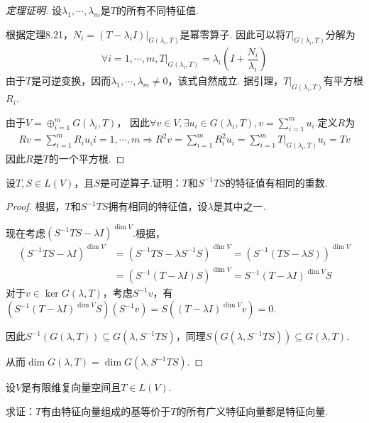 \begin{proof}[定理证明]
    设\(\lambda_1,\cdots,\lambda_m\)是\(T\)的所有不同特征值.

    根据定理8.21，\(N_i=(T-\lambda_i I)|_{G(\lambda_i,T)}\)是幂零算子.
    因此可以将\(T|_{G(\lambda_i,T)}\)分解为
    \begin{align*}
        \forall i=1,\cdots,m,T|_{G(\lambda_i,T)}=\lambda_i(I+\dfrac{N_i}{\lambda_i})
    \end{align*}
    由于\(T\)是可逆变换，因而\(\lambda_1,\cdots,\lambda_m \ne 0\)，该式自然成立.
    据引理，\(T|_{G(\lambda_i,T)}\)有平方根\(R_i\).
    
    由于\(V=\oplus_{i=1}^m G(\lambda_i,T)\)，
    因此\(\forall v \in V,\exists u_i \in G(\lambda_i,T),v=\sum_{i=1}^m u_i\).定义\(R\)为
    \begin{align*}
        Rv=\sum_{i=1}^m R_iu_i i=1,\cdots,m \Rightarrow
        R^2v=\sum_{i=1}^m R_i^2 u_i=\sum_{i=1}^m T|_{G(\lambda_i,T)}u_i=Tv
    \end{align*}
    因此\(R\)是\(T\)的一个平方根.
\end{proof}

\newpage

\begin{problem}[3]\label{8.B.3}
    设\(T,S \in L(V)\)，且\(S\)是可逆算子.证明：\(T\)和\(S^{-1}TS\)的特征值有相同的重数.
\end{problem}

\begin{proof}
    根据，\(T\)和\(S^{-1}TS\)拥有相同的特征值，设\(\lambda\)是其中之一.

    现在考虑\((S^{-1}TS-\lambda I)^{\dim V}\).根据，
    \begin{align*}
        (S^{-1}TS-\lambda I)^{\dim V}&=(S^{-1}TS-\lambda S^{-1}S)^{\dim V}=(S^{-1}(TS-\lambda S))^{\dim V} \\
        &=(S^{-1}(T-\lambda I)S)^{\dim V}=S^{-1}(T-\lambda I)^{\dim V}S
    \end{align*}
    对于\(v \in \ker G(\lambda,T)\)，考虑\(S^{-1}v\)，有\((S^{-1}(T-\lambda I)^{\dim V}S)(S^{-1}v)=S((T-\lambda I)^{\dim V}v)=0\).
    
    因此\(S^{-1}(G(\lambda,T)) \subseteq G(\lambda,S^{-1}TS)\)，同理\(S(G(\lambda,S^{-1}TS)) \subseteq G(\lambda,T)\).
    
    从而\(\dim G(\lambda,T)=\dim G(\lambda,S^{-1}TS)\).
\end{proof}

\begin{problem}[5]\label{8.B.5}
    设\(V\)是有限维复向量空间且\(T \in L(V)\).

    求证：\(T\)有由特征向量组成的基等价于\(T\)的所有广义特征向量都是特征向量.
\end{problem}

